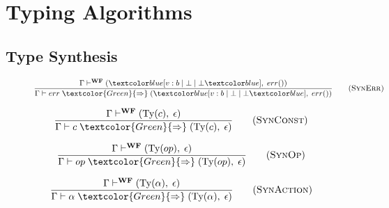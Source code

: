 \section{Typing Algorithms}\label{app:alg}

\subsection{Type Synthesis}

\begin{figure}[H]
    \begin{multicols}{2}
        \begin{equation}
            \frac{
                \Gamma \vdash^{\textbf{WF}} (\under{v: b \;|\; \bot \;|\; \bot}, \; err())
            }{
                \Gamma \vdash err \;\textcolor{Green}{\Rightarrow}\; (\under{v: b \;|\; \bot \;|\; \bot}, \; err())
            }
            \tag{\textsc{SynErr}}
            \label{eq:synerr}
        \end{equation}
        
        \columnbreak
    
        \begin{equation}
            \frac{
                \Gamma \vdash^{\textbf{WF}} (\text{Ty}(c), \; \epsilon)
            }{
                \Gamma \vdash c \;\textcolor{Green}{\Rightarrow}\; (\text{Ty}(c), \; \epsilon)
            }
            \tag{\textsc{SynConst}}
            \label{eq:synconst}
        \end{equation}
    \end{multicols}

    \begin{multicols}{2}
        \begin{equation}
            \frac{
                \Gamma \vdash^{\textbf{WF}} (\text{Ty}(op), \; \epsilon)
            }{
                \Gamma \vdash op \;\textcolor{Green}{\Rightarrow}\; (\text{Ty}(op), \; \epsilon)
            }
            \tag{\textsc{SynOp}}
            \label{eq:synop}
        \end{equation}

        \columnbreak

        \begin{equation}
            \frac{
                \Gamma \vdash^{\textbf{WF}} (\text{Ty}(\alpha), \; \epsilon)
            }{
                \Gamma \vdash \alpha \;\textcolor{Green}{\Rightarrow}\; (\text{Ty}(\alpha), \; \epsilon)
            }
            \tag{\textsc{SynAction}}
            \label{eq:synaction}
        \end{equation}
    \end{multicols}


\end{figure}
